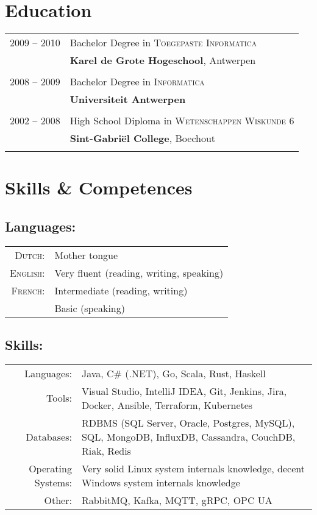 \documentclass[a4paper,10pt]{article}
\begin{document}
\section{\textcolor{awesome-red}{Edu}cation}
\begin{tabular}{rl}	
2009 – 2010& Bachelor Degree in \textsc{Toegepaste Informatica}\\
&\normalsize\textbf{Karel de Grote Hogeschool}, Antwerpen\\&\\
2008 – 2009& Bachelor Degree in \textsc{Informatica}\\
&\normalsize\textbf{Universiteit Antwerpen}\\&\\
2002 – 2008& High School Diploma in \textsc{Wetenschappen Wiskunde 6}\\
&\normalsize\textbf{Sint-Gabriël College}, Boechout\\&\\
\end{tabular}

\section{\textcolor{awesome-red}{Ski}lls \& Competences}

\subsection{Languages:}
\begin{tabular}{rl}
\textsc{Dutch:}&Mother tongue\\
\textsc{English:}&Very fluent (reading, writing, speaking)\\
\textsc{French:}&Intermediate (reading, writing) \\ & Basic (speaking)\\
\end{tabular}

\subsection{Skills:}
\begin{tabular}{rp{11cm}}
Languages:& Java, C\# (.NET), Go, Scala, Rust, Haskell\\
Tools:& Visual Studio, IntelliJ IDEA, Git, Jenkins, Jira, Docker, Ansible, Terraform, Kubernetes\\
Databases:& RDBMS (SQL Server, Oracle, Postgres, MySQL), SQL, MongoDB, InfluxDB, Cassandra, CouchDB, Riak, Redis\\
Operating Systems:& Very solid Linux system internals knowledge, decent Windows  system internals knowledge\\
Other:& RabbitMQ, Kafka, MQTT, gRPC, OPC UA
\end{tabular}
\end{document}
